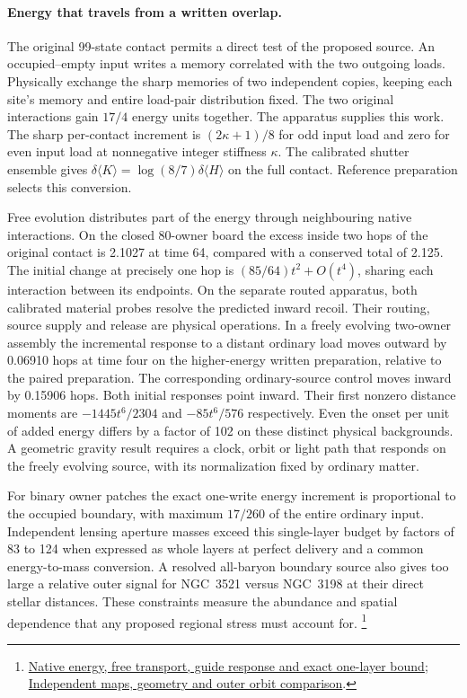 \documentclass[11pt]{article}
\begin{document}
\paragraph{Energy that travels from a written overlap.}
The original 99-state contact permits a direct test of the proposed source.
An occupied--empty input writes a memory correlated with the two
outgoing loads. Physically exchange the sharp memories of two independent
copies, keeping each site's memory and entire load-pair distribution fixed.
The two original interactions gain $17/4$ energy units together. The
apparatus supplies this work. The sharp per-contact increment is
$(2\kappa+1)/8$ for odd input load and zero for even input load at
nonnegative integer stiffness $\kappa$. The calibrated shutter ensemble
gives $\delta\langle K\rangle=\log(8/7)\delta\langle H\rangle$
on the full contact. Reference preparation selects this conversion.

Free evolution distributes part of the energy through neighbouring
native interactions. On the closed 80-owner board the excess inside
two hops of the original contact is 2.1027 at time 64, compared with
a conserved total of 2.125. The initial change at precisely one hop is
$(85/64)t^2+O(t^4)$, sharing each interaction between its endpoints.
On the separate routed apparatus, both calibrated material probes
resolve the predicted inward recoil. Their routing, source supply and
release are physical operations. In a freely evolving two-owner assembly
the incremental response to a distant ordinary load moves outward by
0.06910 hops at time four on the higher-energy written preparation,
relative to the paired preparation. The corresponding ordinary-source
control moves inward by 0.15906 hops. Both initial responses point
inward. Their first nonzero distance moments are $-1445t^6/2304$
and $-85t^6/576$ respectively. Even the onset per unit of added energy
differs by a factor of 102 on these distinct physical backgrounds.
A geometric gravity result requires
a clock, orbit or light path that responds on the freely evolving
source, with its normalization fixed by ordinary matter.

For binary owner patches the exact one-write energy increment is
proportional to the occupied boundary, with maximum $17/260$ of the
entire ordinary input. Independent lensing aperture masses exceed this
single-layer budget by factors of 83 to 124 when expressed as whole
layers at perfect delivery and a common energy-to-mass conversion.
A resolved all-baryon boundary source also gives too large a relative
outer signal for NGC~3521 versus NGC~3198 at their direct stellar
distances. These constraints measure the abundance and spatial
dependence that any proposed regional stress must account for.%
\footnote{\href{https://github.com/FloatingPragma/observer-patch-holography/tree/main/model/experiments/interval_echo_shell_flux/product_address/green_response/material_recoil/overlap_source/native_boundary}{Native energy, free transport, guide response and exact one-layer bound};
\href{https://github.com/FloatingPragma/observer-patch-holography/tree/main/code/cosmology/rar_deep_regime/boundary_source}{Independent maps, geometry and outer orbit comparison}.}
\end{document}

